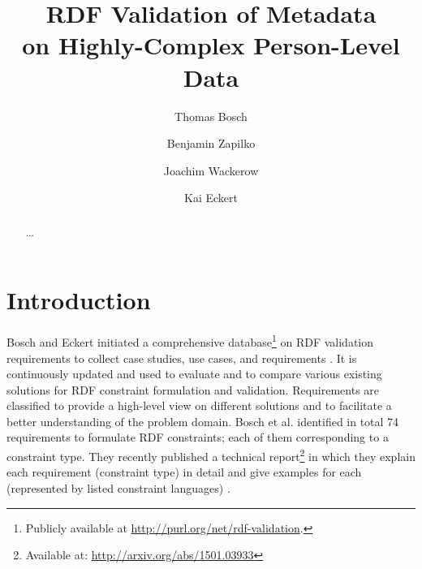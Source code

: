 \documentclass{llncs}
\begin{document}
\renewcommand{\arraystretch}{1.3}
%
%
\title{RDF Validation of Metadata \\ on Highly-Complex Person-Level Data}
\subtitle{}

%
\author{Thomas Bosch \and Benjamin Zapilko \and Joachim Wackerow \and Kai Eckert}
%
\authorrunning{} %
%

\maketitle              %

\begin{abstract}
...


\end{abstract}

\section{Introduction}

Bosch and Eckert initiated a comprehensive database\footnote{Publicly available at \url{http://purl.org/net/rdf-validation}.} on RDF validation requirements to collect case studies, use cases, and requirements \cite{BoschEckert2014}. 
It is continuously updated and used to evaluate and to compare various existing solutions for RDF constraint formulation and validation. 
Requirements are classified to provide a high-level view on different solutions and to facilitate a better understanding of the problem domain.
Bosch et al. identified in total 74 requirements to formulate RDF constraints; each of them corresponding to a constraint type. 
They recently published a technical report\footnote{Available at: \url{http://arxiv.org/abs/1501.03933}} in which they explain each requirement (constraint type) in detail and give examples for each (represented by listed constraint languages) \cite{BoschNolleAcarEckert2015}.
\end{document}
